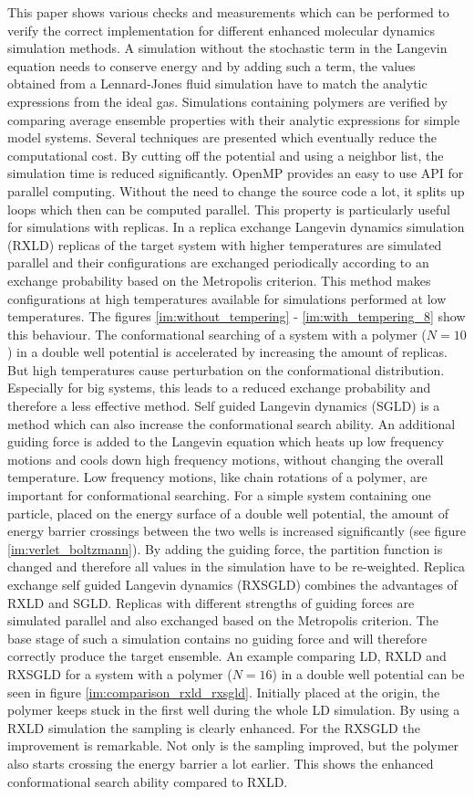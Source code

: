 \documentclass[a4paper]{article}
\begin{document}
This paper shows various checks and measurements which can be performed to verify the correct implementation for different enhanced molecular dynamics simulation methods. A simulation without the stochastic term in the Langevin equation needs to conserve energy and by adding such a term, the values obtained from a Lennard-Jones fluid simulation have to match the analytic expressions from the ideal gas. Simulations containing polymers are verified by comparing average ensemble properties with their analytic expressions for simple model systems. Several techniques are presented which eventually reduce the computational cost. By cutting off the potential and using a neighbor list, the simulation time is reduced significantly. OpenMP provides an easy to use API for parallel computing. Without the need to change the source code a lot, it splits up loops which then can be computed parallel. This property is particularly useful for simulations with replicas. In a replica exchange Langevin dynamics simulation (RXLD) replicas of the target system with higher temperatures are simulated parallel and their configurations are exchanged periodically according to an exchange probability based on the Metropolis criterion. This method makes configurations at high temperatures available for simulations performed at low temperatures. The figures \ref{im:without_tempering} - \ref{im:with_tempering_8} show this behaviour. The conformational searching of a system with a polymer ($N = 10$) in a double well potential is accelerated by increasing the amount of replicas. But high temperatures cause perturbation on the conformational distribution. Especially for big systems, this leads to a reduced exchange probability and therefore a less effective method. Self guided Langevin dynamics (SGLD) is a method which can also increase the conformational search ability. An additional guiding force is added to the Langevin equation which heats up low frequency motions and cools down high frequency motions, without changing the overall temperature. Low frequency motions, like chain rotations of a polymer, are important for conformational searching. For a simple system containing one particle, placed on the energy surface of a double well potential, the amount of energy barrier crossings between the two wells is increased significantly (see figure \ref{im:verlet_boltzmann}). By adding the guiding force, the partition function is changed and therefore all values in the simulation have to be re-weighted. Replica exchange self guided Langevin dynamics (RXSGLD) combines the advantages of RXLD and SGLD. Replicas with different strengths of guiding forces are simulated parallel and also exchanged based on the Metropolis criterion. The base stage of such a simulation contains no guiding force and will therefore correctly produce the target ensemble. An example comparing LD, RXLD and RXSGLD for a system with a polymer ($N = 16$) in a double well potential can be seen in figure \ref{im:comparison_rxld_rxsgld}. Initially placed at the origin, the polymer keeps stuck in the first well during the whole LD simulation. By using a RXLD simulation the sampling is clearly enhanced. For the RXSGLD the improvement is remarkable. Not only is the sampling improved, but the polymer also starts crossing the energy barrier a lot earlier. This shows the enhanced conformational search ability compared to RXLD. 

\newpage 
 

\end{document}
